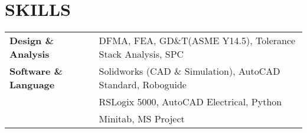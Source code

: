 \documentclass{article}
\begin{document}
\section{\color{BrickRed} SKILLS}


\begin{tabular}{ll}


\vspace{0.5em}				%
\large\textbf{Design \& Analysis}	&DFMA, FEA, GD\&T(ASME Y14.5), Tolerance Stack Analysis, SPC \\

\large\textbf{Software \& Language}	&Solidworks (CAD \& Simulation), AutoCAD Standard, Roboguide \\
					&RSLogix 5000, AutoCAD Electrical, Python \\
					&Minitab, MS Project

\end{tabular}


\end{document}
